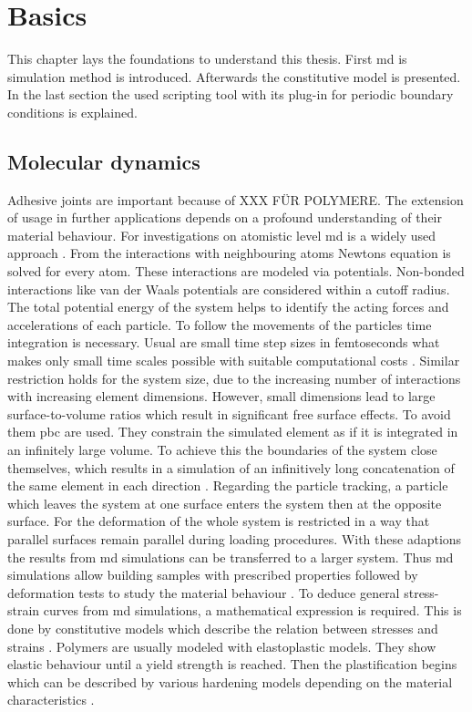 \chapter{Basics}
This chapter lays the foundations to understand this thesis. First \acrfull{md} is simulation method is introduced. Afterwards the constitutive model is presented. In the last section the used scripting tool with its plug-in for periodic boundary conditions is explained.  

\section{Molecular dynamics}
Adhesive joints are important because of XXX FÜR POLYMERE. The extension of usage in further applications depends on a profound understanding of their material behaviour. For investigations on atomistic level \acrfull{md} is a widely used approach  \cite{ries_mechanical_2024}. From the interactions with neighbouring atoms Newtons equation is solved for every atom. These interactions are modeled via potentials. Non-bonded interactions like van der Waals potentials are considered within a cutoff radius. The total potential energy of the system helps to identify the acting forces and accelerations of each particle. To follow the movements of the particles time integration is necessary. Usual are small time step sizes in femtoseconds what makes only small time scales possible with suitable computational costs \cite{ries_mechanical_2024}. Similar restriction holds for the system size, due to the increasing number of interactions with increasing element dimensions. However, small dimensions lead to large surface-to-volume ratios which result in significant free surface effects. To avoid them \acrfull{pbc} are used. They constrain the simulated element as if it is integrated in an infinitely large volume. To achieve this the boundaries of the system close themselves, which results in a simulation of an infinitively long concatenation of the same element in each direction \cite{gorbunov_periodic_2022}. Regarding the particle tracking, a particle which leaves the system at one surface enters the system then at the opposite surface. For the deformation of the whole system is restricted in a way that parallel surfaces remain parallel during loading procedures. With these adaptions the results from \acrshort{md} simulations can be transferred to a larger system. Thus \acrshort{md} simulations allow building samples with prescribed properties followed by deformation tests to study the material behaviour \cite{buyukozturk_structural_2011}. To deduce general stress-strain curves from \acrshort{md} simulations, a mathematical expression is required. This is done by constitutive models which describe the relation between stresses and strains \cite{mergheim_lecture_nodate}. Polymers are usually modeled with elastoplastic models. They show elastic behaviour until a yield strength is reached. Then the plastification begins which can be described by various hardening models depending on the material characteristics \cite{mergheim_lecture_nodate}.


